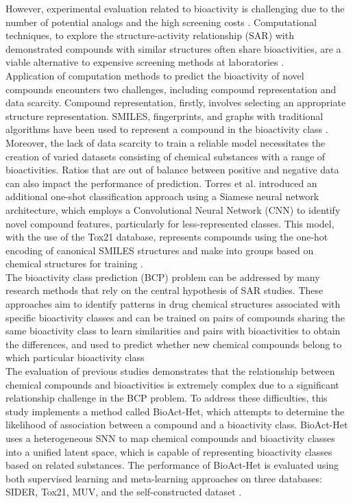 \documentclass[conference]{IEEEtran}
\begin{document}
However, experimental evaluation related to bioactivity is challenging due to the number of potential analogs and the high screening costs \citet{Reymond}. Computational techniques, to explore the structure-activity relationship (SAR) with demonstrated compounds with similar structures often share bioactivities, are a viable alternative to expensive screening methods at laboratories \citet{Nantasenamat}.\\

Application of computation methods to predict the bioactivity of novel compounds encounters two challenges, including compound representation and data scarcity. Compound representation, firstly, involves selecting an appropriate structure representation. SMILES, fingerprints, and graphs with traditional algorithms have been used to represent a compound in the bioactivity class \citet{Weininger}. Moreover, the lack of data scarcity to train a reliable model necessitates the creation of varied datasets consisting of chemical substances with a range of bioactivities. Ratios that are out of balance between positive and negative data can also impact the performance of prediction. Torres et al. introduced an additional one-shot classification approach using a Siamese neural network architecture, which employs a Convolutional Neural Network (CNN) to identify novel compound features, particularly for less-represented classes. This model, with the use of the Tox21 database, represents compounds using the one-hot encoding of canonical SMILES structures and make into groups based on chemical structures for training \citet{Weininger}.\\

The bioactivity class prediction (BCP) problem can be addressed by many research methods that rely on the central hypothesis of SAR studies. These approaches aim to identify patterns in drug chemical structures associated with specific bioactivity classes and can be trained on pairs of compounds sharing the same bioactivity class to learn similarities and pairs with bioactivities to obtain the differences, and used to predict whether new chemical compounds belong to which particular bioactivity class \citet{Vella}\\

The evaluation of previous studies demonstrates that the relationship between chemical compounds and bioactivities is extremely complex due to a significant relationship challenge in the BCP problem. To address these difficulties, this study implements a method called BioAct-Het, which attempts to determine the likelihood of association between a compound and a bioactivity class. BioAct-Het uses a heterogeneous SNN to map chemical compounds and bioactivity classes into a unified latent space, which is capable of representing bioactivity classes based on related substances. The performance of BioAct-Het is evaluated using both supervised learning and meta-learning approaches on three databases: SIDER, Tox21, MUV, and the self-constructed dataset \citet{Heyrati}.\\
\end{document}
